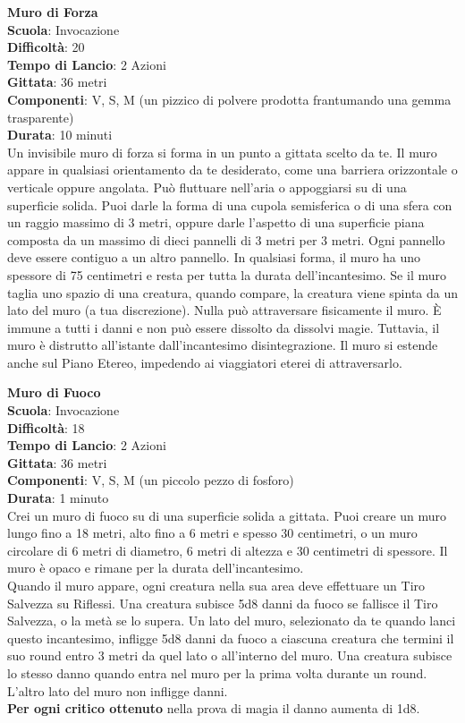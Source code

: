 \begin{multicols}{2}
\medskip\textbf{Muro di Forza}\\
\textbf{Scuola}: Invocazione\\
\textbf{Difficoltà}: 20\\
\textbf{Tempo di Lancio}: 2 Azioni\\
\textbf{Gittata}: 36 metri\\
\textbf{Componenti}: V, S, M (un pizzico di polvere prodotta frantumando una gemma trasparente)\\
\textbf{Durata}: 10 minuti\\
Un invisibile muro di forza si forma in un punto a gittata scelto da te. Il muro appare in qualsiasi orientamento da te desiderato, come una barriera orizzontale o verticale oppure angolata. Può fluttuare nell'aria o appoggiarsi su di una superficie solida. Puoi darle la forma di una cupola semisferica o di una sfera con un raggio massimo di 3 metri, oppure darle l'aspetto di una superficie piana composta da un massimo di dieci pannelli di 3 metri per 3 metri. Ogni pannello deve essere contiguo a un altro pannello. In qualsiasi forma, il muro ha uno spessore di 75 centimetri e resta per tutta la durata dell'incantesimo. Se il muro taglia uno spazio di una creatura, quando compare, la creatura viene spinta da un lato del muro (a tua discrezione). Nulla può attraversare fisicamente il muro. È immune a tutti i danni e non può essere dissolto da dissolvi magie. Tuttavia, il muro è distrutto all'istante dall'incantesimo disintegrazione. Il muro si estende anche sul Piano Etereo, impedendo ai viaggiatori eterei di attraversarlo.

\medskip\textbf{Muro di Fuoco}\\
\textbf{Scuola}: Invocazione\\
\textbf{Difficoltà}: 18\\
\textbf{Tempo di Lancio}: 2 Azioni\\
\textbf{Gittata}: 36 metri\\
\textbf{Componenti}: V, S, M (un piccolo pezzo di fosforo)\\
\textbf{Durata}: 1 minuto\\
Crei un muro di fuoco su di una superficie solida a gittata. Puoi creare un muro lungo fino a 18 metri, alto fino a 6 metri e spesso 30 centimetri, o un muro circolare di 6 metri di diametro, 6 metri di altezza e 30 centimetri di spessore. Il muro è opaco e rimane per la durata dell'incantesimo. \\
Quando il muro appare, ogni creatura nella sua area deve effettuare un Tiro Salvezza su Riflessi. Una creatura subisce 5d8 danni da fuoco se fallisce il Tiro Salvezza, o la metà se lo supera. Un lato del muro, selezionato da te quando lanci questo incantesimo, infligge 5d8 danni da fuoco a ciascuna creatura che termini il suo round entro 3 metri da quel lato o all'interno del muro. Una creatura subisce lo stesso danno quando entra nel muro per la prima volta durante un round. L'altro lato del muro non infligge danni.\\
\textbf{Per ogni critico ottenuto} nella prova di magia il danno aumenta di 1d8.


\end{multicols}
